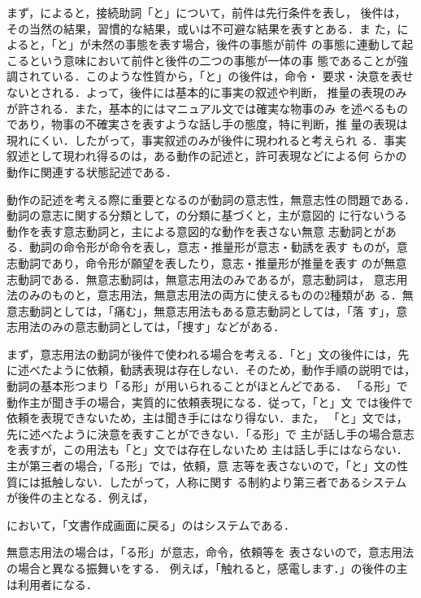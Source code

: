 まず，\cite{kuno}によると，接続助詞「と」について，前件は先行条件を表し，
後件は，その当然の結果，習慣的な結果，或いは不可避な結果を表すとある．ま
た，\cite{masu}によると，「と」が未然の事態を表す場合，後件の事態が前件
の事態に連動して起こるという意味において前件と後件の二つの事態が一体の事
態であることが強調されている．このような性質から，「と」の後件は，命令・
要求・決意を表せないとされる．よって，後件には基本的に事実の叙述や判断，
推量の表現のみが許される．また，基本的にはマニュアル文では確実な物事のみ
を述べるものであり，物事の不確実さを表すような話し手の態度，特に判断，推
量の表現は現れにくい．したがって，事実叙述のみが後件に現われると考えられ
る．事実叙述として現われ得るのは，ある動作の記述と，許可表現などによる何
らかの動作に関連する状態記述である．

動作の記述を考える際に重要となるのが動詞の意志性，無意志性の問題である．
動詞の意志に関する分類として，\cite{ipa}の分類に基づくと，{\dg 主}が意図的
に行ないうる動作を表す意志動詞と，{\dg 主}による意図的な動作を表さない無意
志動詞とがある．動詞の命令形が命令を表し，意志・推量形が意志・勧誘を表す
ものが，意志動詞であり，命令形が願望を表したり，意志・推量形が推量を表す
のが無意志動詞である．無意志動詞は，無意志用法のみであるが，意志動詞は，
意志用法のみのものと，意志用法，無意志用法の両方に使えるものの2種類があ
る．無意志動詞としては，「痛む」，無意志用法もある意志動詞としては，「落
す」，意志用法のみの意志動詞としては，「捜す」などがある．

まず，意志用法の動詞が後件で使われる場合を考える．「と」文の後件には，先
に述べたように依頼，勧誘表現は存在しない．そのため，動作手順の説明では，
動詞の基本形つまり「る形」\cite{井上}が用いられることがほとんどである．
「る形」で動作主が聞き手の場合，実質的に依頼表現になる．従って，「と」文
では後件で依頼を表現できないため，{\dg 主}は聞き手にはなり得ない．また，
「と」文では，先に述べたように決意を表すことができない．「る形」で{\dg 
主}が話し手の場合意志を表すが，この用法も「と」文では存在しないため{\dg 
主}は話し手にはならない．{\dg 主}が第三者の場合，「る形」では，依頼，意
志等を表さないので，「と」文の性質には抵触しない．したがって，人称に関す
る制約より第三者であるシステムが後件の{\dg 主}となる．例えば，

において，「文書作成画面に戻る」のはシステムである．
        
無意志用法の場合は，「る形」が意志，命令，依頼等を
表さないので，意志用法の場合と異なる振舞いをする．
例えば，「触れると，感電します．」の後件の{\dg 主}は利用者になる．

